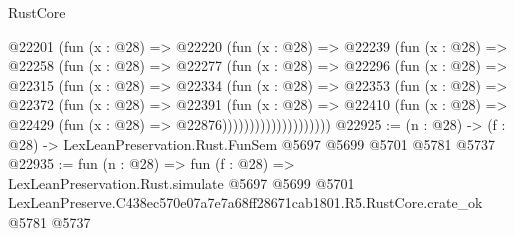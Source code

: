 \begin{lexlean}{RustCore}
\begin{coremodule}
                @22201
                  (fun (x : @28) =>
                  @22220
                    (fun (x : @28) =>
                    @22239
                      (fun (x : @28) =>
                      @22258
                        (fun (x : @28) =>
                        @22277
                          (fun (x : @28) =>
                          @22296
                            (fun (x : @28) =>
                            @22315
                              (fun (x : @28) =>
                              @22334
                                (fun (x : @28) =>
                                @22353
                                  (fun (x : @28) =>
                                  @22372
                                    (fun (x : @28) =>
                                    @22391
                                      (fun (x : @28) =>
                                      @22410
                                        (fun (x : @28) =>
                                        @22429 (fun (x : @28) => @22876))))))))))))))))))))
@22925 := (n : @28) -> (f : @28) -> LexLeanPreservation.Rust.FunSem @5697 @5699 @5701 @5781 @5737
@22935 := fun (n : @28) =>
  fun (f : @28) =>
  LexLeanPreservation.Rust.simulate
    @5697
    @5699
    @5701
    LexLeanPreserve.C438ec570e07a7e7a68ff28671cab1801.R5.RustCore.crate_ok
    @5781
    @5737
\end{coremodule}
\end{lexlean}
